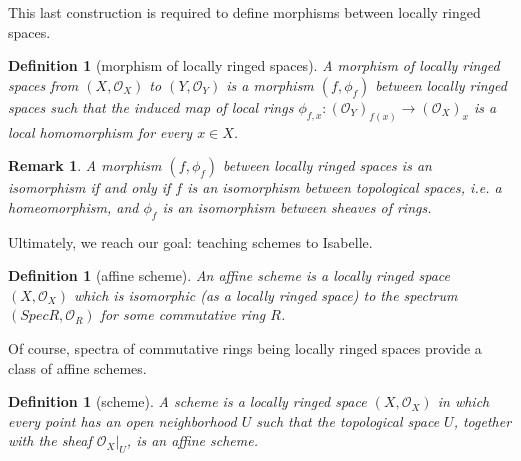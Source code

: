 \documentclass[12pt]{scrartcl}
\newtheorem{definition}[proposition]{Definition}
\newtheorem{remark}[proposition]{Remark}
\begin{document}

This last construction is required to define morphisms between locally ringed spaces.
			
\begin{definition}[morphism of locally ringed spaces]
	A morphism of locally ringed spaces from $(X, \mathscr{O}_X)$ to $(Y, \mathscr{O}_Y)$ is a morphism $(f, \phi_f)$ between locally ringed spaces such that the induced map of local rings $\phi_{f, x}: (\mathscr{O}_Y)_{f(x)} \rightarrow (\mathscr{O}_X)_x$ is a local homomorphism for every $x \in X$.  
\end{definition}


\begin{remark}
	A morphism $(f, \phi_f)$ between locally ringed spaces is an isomorphism if and only if $f$ is an isomorphism between topological spaces, \textit{i.e.} a homeomorphism, and $\phi_f$ is an isomorphism between sheaves of rings.
\end{remark}


Ultimately, we reach our goal: teaching schemes to Isabelle.	

\begin{definition}[affine scheme]
	An affine scheme is a locally ringed space $(X, \mathscr{O}_X)$ which is isomorphic (as a locally ringed space) to the spectrum $(Spec R, \mathscr{O}_R)$ for some commutative ring $R$. 
\end{definition}


Of course, spectra of commutative rings being locally ringed spaces provide a class of affine schemes.


\begin{definition}[scheme]
	A scheme is a locally ringed space $(X, \mathscr{O}_X)$ in which every point has an open neighborhood $U$ such that the topological space $U$, together with the sheaf $\mathscr{O}_X | _U$, is an affine scheme.
\end{definition}

\end{document}
